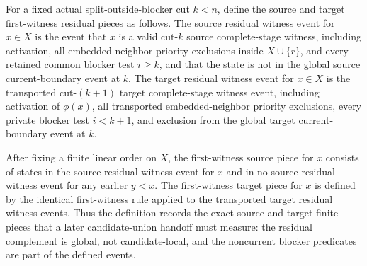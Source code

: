 \begin{definition}
For a fixed actual split-outside-blocker cut \(k<n\), define the source and
target first-witness residual pieces as follows.  The source residual witness
event for \(x\in X\) is the event that \(x\) is a valid cut-\(k\) source
complete-stage witness, including activation, all embedded-neighbor priority
exclusions inside \(X\cup\{r\}\), and every retained common blocker test
\(i\ge k\), and that the state is not in the global source current-boundary
event at \(k\).  The target residual witness event for \(x\in X\) is the
transported cut-\((k+1)\) target complete-stage witness event, including
activation of \(\phi(x)\), all transported embedded-neighbor priority
exclusions, every private blocker test \(i<k+1\), and exclusion from the
global target current-boundary event at \(k\).

After fixing a finite linear order on \(X\), the first-witness source piece
for \(x\) consists of states in the source residual witness event for \(x\)
and in no source residual witness event for any earlier \(y<x\).  The
first-witness target piece for \(x\) is defined by the identical first-witness
rule applied to the transported target residual witness events.  Thus the
definition records the exact source and target finite pieces that a later
candidate-union handoff must measure: the residual complement is global, not
candidate-local, and the noncurrent blocker predicates are part of the
defined events.
\end{definition}
